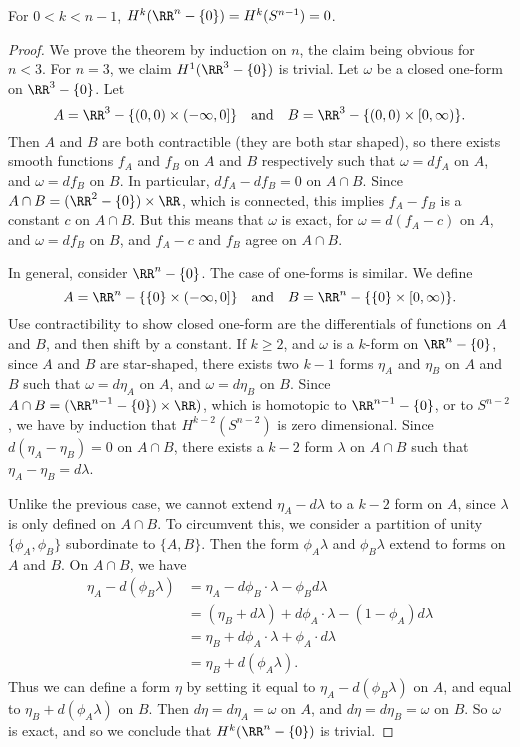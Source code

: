 \begin{theorem}
    For $0 < k < n-1$, $H^k(\RR^n - \{ 0 \}) = H^k(S^{n-1}) = 0$.
\end{theorem}
\begin{proof}
    We prove the theorem by induction on $n$, the claim being obvious for $n < 3$. For $n = 3$, we claim $H^1(\RR^3 - \{ 0 \})$ is trivial. Let $\omega$ be a closed one-form on $\RR^3 - \{ 0 \}$. Let
    \[ A = \RR^3 - \{ (0,0) \times (-\infty,0] \} \quad\text{and}\quad B = \RR^3 - \{ (0,0) \times [0,\infty) \}. \]
    Then $A$ and $B$ are both contractible (they are both star shaped), so there exists smooth functions $f_A$ and $f_B$ on $A$ and $B$ respectively such that $\omega = df_A$ on $A$, and $\omega = df_B$ on $B$. In particular, $df_A - df_B = 0$ on $A \cap B$. Since $A \cap B = (\RR^2 - \{ 0 \}) \times \RR$, which is connected, this implies $f_A - f_B$ is a constant $c$ on $A \cap B$. But this means that $\omega$ is exact, for $\omega = d(f_A - c)$ on $A$, and $\omega = df_B$ on $B$, and $f_A - c$ and $f_B$ agree on $A \cap B$.

    In general, consider $\RR^n - \{ 0 \}$. The case of one-forms is similar. We define
    \[  A = \RR^n - \{ \{ 0 \} \times (-\infty,0] \} \quad\text{and}\quad B = \RR^n - \{ \{ 0 \} \times [0,\infty) \}. \]
    Use contractibility to show closed one-form are the differentials of functions on $A$ and $B$, and then shift by a constant. If $k \geq 2$, and $\omega$ is a $k$-form on $\RR^n - \{ 0 \}$, since $A$ and $B$ are star-shaped, there exists two $k-1$ forms $\eta_A$ and $\eta_B$ on $A$ and $B$ such that $\omega = d\eta_A$ on $A$, and $\omega = d\eta_B$ on $B$. Since $A \cap B = (\RR^{n-1} - \{ 0 \}) \times \RR)$, which is homotopic to $\RR^{n-1} - \{ 0 \}$, or to $S^{n-2}$, we have by induction that $H^{k-2}(S^{n-2})$ is zero dimensional. Since $d(\eta_A - \eta_B) = 0$ on $A \cap B$, there exists a $k-2$ form $\lambda$ on $A \cap B$ such that $\eta_A - \eta_B = d\lambda$.

    Unlike the previous case, we cannot extend $\eta_A - d\lambda$ to a $k-2$ form on $A$, since $\lambda$ is only defined on $A \cap B$. To circumvent this, we consider a partition of unity $\{ \phi_A, \phi_B \}$ subordinate to $\{ A, B \}$. Then the form $\phi_A \lambda$ and $\phi_B \lambda$ extend to forms on $A$ and $B$. On $A \cap B$, we have
    \begin{align*}
        \eta_A - d(\phi_B \lambda) &= \eta_A - d\phi_B \cdot \lambda - \phi_B d\lambda\\
            &= (\eta_B + d\lambda) + d\phi_A \cdot \lambda - (1 - \phi_A) d\lambda\\
            &= \eta_B + d\phi_A \cdot \lambda + \phi_A \cdot d\lambda\\
            &= \eta_B + d(\phi_A \lambda).
    \end{align*}
    Thus we can define a form $\eta$ by setting it equal to $\eta_A - d(\phi_B \lambda)$ on $A$, and equal to $\eta_B + d(\phi_A \lambda)$ on $B$. Then $d\eta = d\eta_A = \omega$ on $A$, and $d\eta = d\eta_B = \omega$ on $B$. So $\omega$ is exact, and so we conclude that $H^k(\RR^n - \{ 0 \})$ is trivial.
\end{proof}

